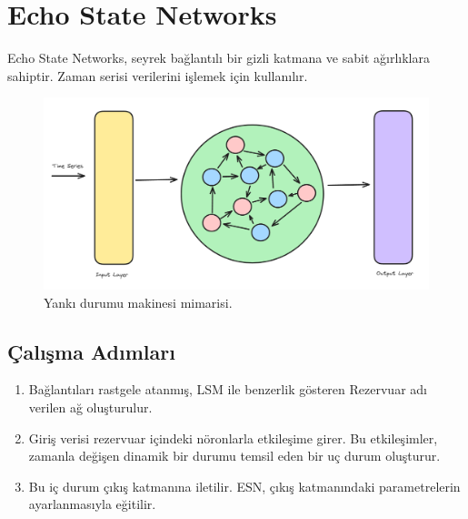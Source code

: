 \section{Echo State Networks}
Echo State Networks, seyrek bağlantılı bir gizli katmana ve sabit ağırlıklara sahiptir. Zaman serisi verilerini işlemek için kullanılır. 

\begin{figure}[h]
    \centering
    \includegraphics[width=1\textwidth]{images/echo_state_network.png}
    \caption{Yankı durumu makinesi mimarisi.}
    \label{fig:enter-label}
\end{figure}

\subsection{Çalışma Adımları}
\begin{enumerate}
    \item Bağlantıları rastgele atanmış, LSM ile benzerlik gösteren Rezervuar adı verilen ağ oluşturulur.
    \item Giriş verisi rezervuar içindeki nöronlarla etkileşime girer. Bu etkileşimler, zamanla değişen dinamik bir durumu temsil eden bir uç durum oluşturur.
    \item Bu iç durum çıkış katmanına iletilir. ESN, çıkış katmanındaki parametrelerin ayarlanmasıyla eğitilir.
\end{enumerate}

\newpage